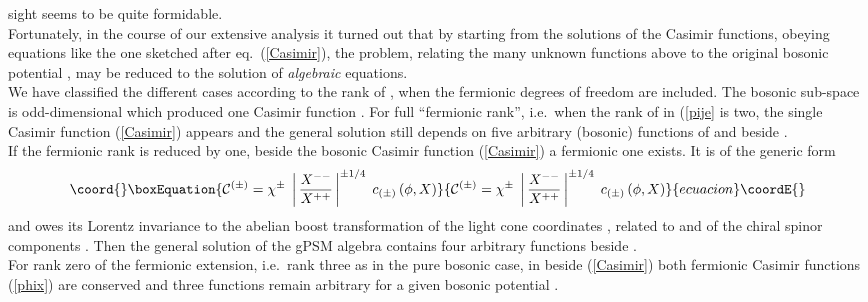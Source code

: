 \documentclass[a4paper,10pt]{article}
\renewcommand{\^}{{}^}
\renewcommand{\_}{\!{}_}
\begin{document}
sight seems to be quite formidable.\\
Fortunately, in the course of our extensive analysis 
\cite{EKS,Ertl:Diss} 
it turned out that by starting from the solutions of the 
Casimir functions, obeying equations like the one sketched 
after eq.\ (\ref{Casimir}), the problem, relating the many unknown 
functions above to the original bosonic potential \coordHE{}, may be 
reduced to the solution of \textit{algebraic} equations.\\
We have classified the different cases according to the rank 
of \coordHE{}, when the fermionic degrees of freedom 
are included. The bosonic sub-space is odd-dimensional which 
produced one Casimir function \coordHE{}. 
For full ``fermionic rank'', i.e.\ when  
the rank of \coordHE{} in (\ref{pije} 
is two, the single Casimir function 
(\ref{Casimir}) appears  and the general solution still depends on 
five  
arbitrary (bosonic) functions of \myHighlight{$\phi$}\coordHE{} and \coordHE{} beside \coordHE{}. 
\\
If the fermionic rank is reduced by one, beside the bosonic 
Casimir function (\ref{Casimir}) a fermionic one exists. It is of the 
generic form 
\begin{equation}\coord{}\boxEquation{
\label{phix}
\mathcal{C}^{(\pm)} = 
\chi^\pm \; \left\vert\, 
\frac{X^{--}}{X^{++}}\,\right\vert^{\pm 1/4}\; 
c_{(\pm)}\, (\phi, X)
}{
\mathcal{C}^{(\pm)} = 
\chi^\pm \; \left\vert\, 
\frac{X^{--}}{X^{++}}\,\right\vert^{\pm 1/4}\; 
c_{(\pm)}\, (\phi, X)
}{ecuacion}\coordE{}\end{equation}
and owes its Lorentz invariance to the abelian boost 
transformation \myHighlight{$\exp (\pm \beta)$}\coordHE{} of the light cone 
coordinates \coordHE{}, related to \coordHE{} and \coordHE{} of the chiral spinor components \myHighlight{$\chi^{\pm}$}\coordHE{}. Then 
the general solution of the gPSM algebra 
contains four arbitrary functions beside \coordHE{}.\\
For rank zero of the fermionic extension, i.e.\ rank three as in 
the pure bosonic case, in \coordHE{} beside 
(\ref{Casimir}) 
both fermionic Casimir functions (\ref{phix}) are conserved and 
three functions remain arbitrary for a given bosonic 
potential \coordHE{}. \\
\end{document}
